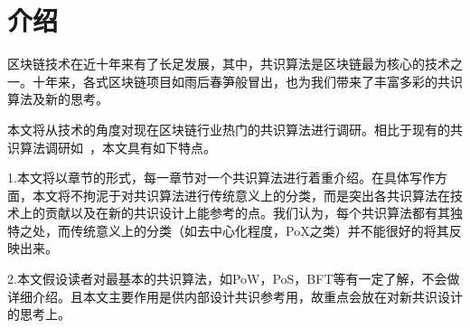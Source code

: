 \section{介绍}
区块链技术在近十年来有了长足发展，其中，共识算法是区块链最为核心的技术之一。十年来，各式区块链项目如雨后春笋般冒出，也为我们带来了丰富多彩的共识算法及新的思考。

本文将从技术的角度对现在区块链行业热门的共识算法进行调研。相比于现有的共识算法调研如~\cite{wang2019survey,袁勇2018区块链共识算法的发展现状与展望}，本文具有如下特点。

1.本文将以章节的形式，每一章节对一个共识算法进行着重介绍。在具体写作方面，本文将不拘泥于对共识算法进行传统意义上的分类，而是突出各共识算法在技术上的贡献以及在新的共识设计上能参考的点。我们认为，每个共识算法都有其独特之处，而传统意义上的分类（如去中心化程度，PoX之类）并不能很好的将其反映出来。

2.本文假设读者对最基本的共识算法，如PoW，PoS，BFT等有一定了解，不会做详细介绍。且本文主要作用是供内部设计共识参考用，故重点会放在对新共识设计的思考上。
